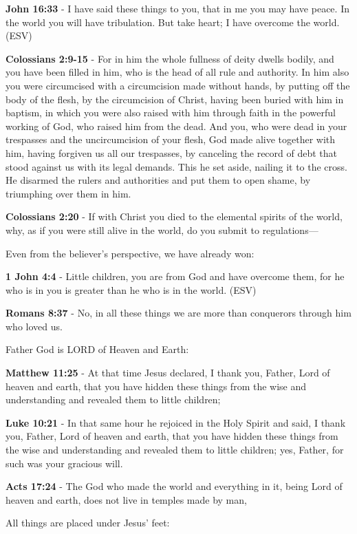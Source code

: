 \documentclass[11pt]{article}
\begin{document}
\textbf{John 16:33} - I have said these things to you, that in me you may have peace.  In the world you will have tribulation.  But take heart; I have overcome the world.  (ESV)

\textbf{Colossians 2:9-15} - For in him the whole fullness of deity dwells bodily, and you have been filled in him, who is the head of all rule and authority. In him also you were circumcised with a circumcision made without hands, by putting off the body of the flesh, by the circumcision of Christ, having been buried with him in baptism, in which you were also raised with him through faith in the powerful working of God, who raised him from the dead. And you, who were dead in your trespasses and the uncircumcision of your flesh, God made alive together with him, having forgiven us all our trespasses, by canceling the record of debt that stood against us with its legal demands. This he set aside, nailing it to the cross. He disarmed the rulers and authorities and put them to open shame, by triumphing over them in him.

\textbf{Colossians 2:20} - If with Christ you died to the elemental spirits of the world, why, as if you were still alive in the world, do you submit to regulations—

Even from the believer's perspective, we have already won:

\textbf{1 John 4:4} -  Little children, you are from God and have overcome them, for he who is in you is greater than he who is in the world.  (ESV)

\textbf{Romans 8:37} - No, in all these things we are more than conquerors through him who loved us.

Father God is LORD of Heaven and Earth:

\textbf{Matthew 11:25} - At that time Jesus declared, I thank you, Father, Lord of heaven and earth, that you have hidden these things from the wise and understanding and revealed them to little children;

\textbf{Luke 10:21} - In that same hour he rejoiced in the Holy Spirit and said, I thank you, Father, Lord of heaven and earth, that you have hidden these things from the wise and understanding and revealed them to little children; yes, Father, for such was your gracious will.

\textbf{Acts 17:24} - The God who made the world and everything in it, being Lord of heaven and earth, does not live in temples made by man,

All things are placed under Jesus' feet:
\end{document}
